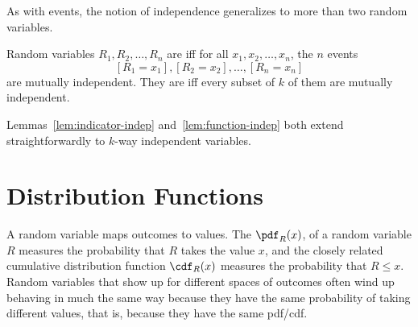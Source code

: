 As with events, the notion of independence generalizes to more than two
random variables.
\begin{definition}
Random variables $R_1, R_2, \dots, R_n$ are  iff
for all $x_1, x_2, \dots, x_n$, the $n$ events
\[
[R_1 = x_1], [R_2 = x_2], \dots, [R_n = x_n]
\] 
are mutually independent.  They are  iff
every subset of $k$ of them are mutually independent.
\iffalse

\begin{eqnarray*}
\lefteqn{\pr{R_1 = x_1 \QAND\ R_2 = x_2 \QAND \cdots \QAND\ R_n = x_n}}\\
        & = & \pr{R_1 = x_1} \cdot \pr{R_2 = x_2} \cdots \pr{R_n = x_n}.
\end{eqnarray*}
for all $x_1, x_2, \dots, x_n$.
\fi

\end{definition}

Lemmas~\ref{lem:indicator-indep} and~\ref{lem:function-indep} both
extend straightforwardly to $k$-way independent variables.

\iffalse
It is a simple exercise to show that the probability that any
\emph{subset} of the variables takes a particular set of values is equal
to the product of the probabilities that the individual variables take
their values.  Thus, for example, if $R_1, R_2, \dots, R_{100}$ are
mutually independent random variables, then it follows that:
\begin{align*}
\lefteqn{\pr{R_1 = 7 \QAND\ R_7 = 9.1 \QAND\ R_{23} = \pi}}\\
 & = \pr{R_1 = 7} \cdot \pr{R_7 = 9.1} \cdot \pr{R_{23} = \pi}.
\end{align*}
\fi

\begin{problems}

\practiceproblems
{}

\homeworkproblems
{}

\end{problems}


\section{Distribution Functions}\label{distributions_sec}

A random variable maps outcomes to values.  The  $\pdf_R(x)$, of a random variable $R$ measures
the probability that $R$ takes the value $x$, and the closely related
cumulative distribution function $\cdf_R(x)$ measures the
probability that $R \leq x$.  Random variables that show up for
different spaces of outcomes often wind up behaving in much the same
way because they have the same probability of taking different values,
that is, because they have the same pdf/cdf.

